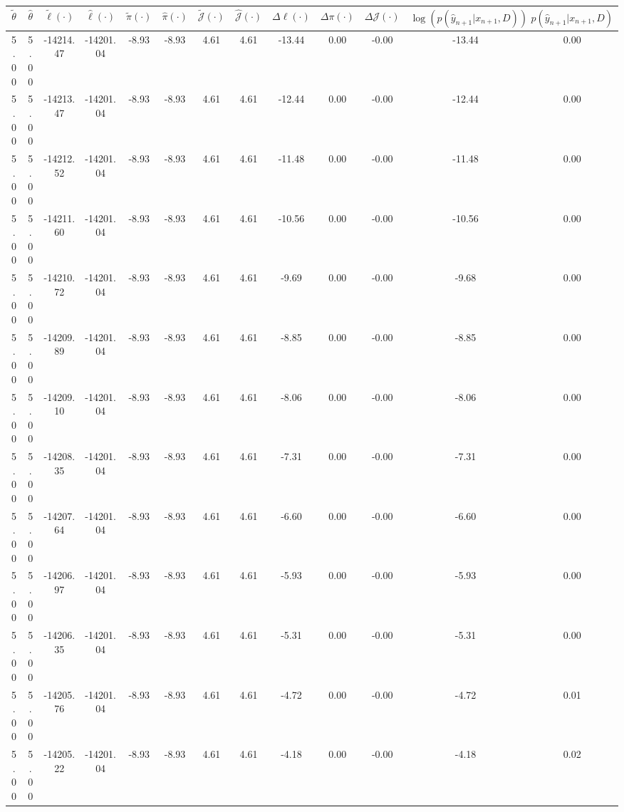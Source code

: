 \begin{table}[htbp]
        \centering
        \tiny
        \begin{adjustbox}{angle=90}
            \begin{tabular}{|c|c|c|c|c|c|c|c|c|c|c|c|c|}
                \hline
                 $\tilde{\theta}$ & $\hat{\theta}$ & $\tilde{\ell}(\cdot)$ & $\hat{\ell}(\cdot)$ & $\tilde{\pi}(\cdot)$ & $\hat{\pi}(\cdot)$ & $\tilde{\mathcal{J}}(\cdot)$ & $\hat{\mathcal{J}}(\cdot)$ & $\Delta \ell(\cdot)$ & $\Delta \pi(\cdot)$ & $\Delta \mathcal{J}(\cdot)$ & $\log(p(\hat{y}_{n+1}|x_{n+1}, D))$ & $p(\hat{y}_{n+1}|x_{n+1}, D)$ \\
                \hline
                 5.00 & 5.00 & -14214.47 & -14201.04 & -8.93 & -8.93 & 4.61 & 4.61 & -13.44 & 0.00 & -0.00 & -13.44 & 0.00\\ \hline
 5.00 & 5.00 & -14213.47 & -14201.04 & -8.93 & -8.93 & 4.61 & 4.61 & -12.44 & 0.00 & -0.00 & -12.44 & 0.00\\ \hline
 5.00 & 5.00 & -14212.52 & -14201.04 & -8.93 & -8.93 & 4.61 & 4.61 & -11.48 & 0.00 & -0.00 & -11.48 & 0.00\\ \hline
 5.00 & 5.00 & -14211.60 & -14201.04 & -8.93 & -8.93 & 4.61 & 4.61 & -10.56 & 0.00 & -0.00 & -10.56 & 0.00\\ \hline
 5.00 & 5.00 & -14210.72 & -14201.04 & -8.93 & -8.93 & 4.61 & 4.61 & -9.69 & 0.00 & -0.00 & -9.68 & 0.00\\ \hline
 5.00 & 5.00 & -14209.89 & -14201.04 & -8.93 & -8.93 & 4.61 & 4.61 & -8.85 & 0.00 & -0.00 & -8.85 & 0.00\\ \hline
 5.00 & 5.00 & -14209.10 & -14201.04 & -8.93 & -8.93 & 4.61 & 4.61 & -8.06 & 0.00 & -0.00 & -8.06 & 0.00\\ \hline
 5.00 & 5.00 & -14208.35 & -14201.04 & -8.93 & -8.93 & 4.61 & 4.61 & -7.31 & 0.00 & -0.00 & -7.31 & 0.00\\ \hline
 5.00 & 5.00 & -14207.64 & -14201.04 & -8.93 & -8.93 & 4.61 & 4.61 & -6.60 & 0.00 & -0.00 & -6.60 & 0.00\\ \hline
 5.00 & 5.00 & -14206.97 & -14201.04 & -8.93 & -8.93 & 4.61 & 4.61 & -5.93 & 0.00 & -0.00 & -5.93 & 0.00\\ \hline
 5.00 & 5.00 & -14206.35 & -14201.04 & -8.93 & -8.93 & 4.61 & 4.61 & -5.31 & 0.00 & -0.00 & -5.31 & 0.00\\ \hline
 5.00 & 5.00 & -14205.76 & -14201.04 & -8.93 & -8.93 & 4.61 & 4.61 & -4.72 & 0.00 & -0.00 & -4.72 & 0.01\\ \hline
 5.00 & 5.00 & -14205.22 & -14201.04 & -8.93 & -8.93 & 4.61 & 4.61 & -4.18 & 0.00 & -0.00 & -4.18 & 0.02\\ \hline

\end{tabular}
\end{adjustbox}
\end{table}
